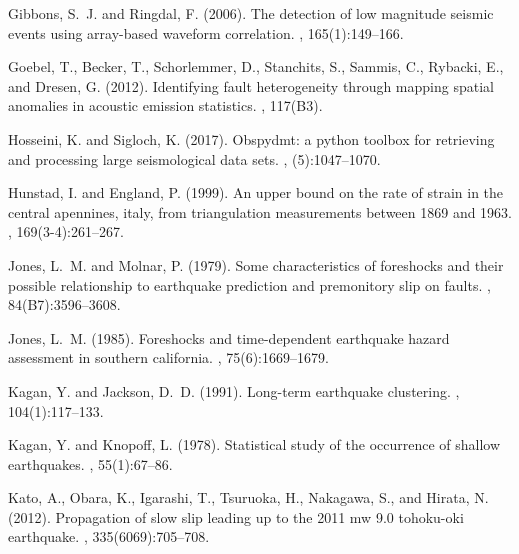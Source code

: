 \documentclass[a4paper,12pt,twoside]{article}
\begin{document}
\begin{thebibliography}{}
Gibbons, S.~J. and Ringdal, F. (2006).
\newblock The detection of low magnitude seismic events using array-based
  waveform correlation.
, 165(1):149--166.

Goebel, T., Becker, T., Schorlemmer, D., Stanchits, S., Sammis, C., Rybacki,
  E., and Dresen, G. (2012).
\newblock Identifying fault heterogeneity through mapping spatial anomalies in
  acoustic emission statistics.
, 117(B3).

Hosseini, K. and Sigloch, K. (2017).
\newblock Obspydmt: a python toolbox for retrieving and processing large
  seismological data sets.
, (5):1047--1070.

Hunstad, I. and England, P. (1999).
\newblock An upper bound on the rate of strain in the central apennines, italy,
  from triangulation measurements between 1869 and 1963.
, 169(3-4):261--267.

Jones, L.~M. and Molnar, P. (1979).
\newblock Some characteristics of foreshocks and their possible relationship to
  earthquake prediction and premonitory slip on faults.
,
  84(B7):3596--3608.

Jones, L.~M. (1985).
\newblock Foreshocks and time-dependent earthquake hazard assessment in
  southern california.
,
  75(6):1669--1679.

Kagan, Y. and Jackson, D.~D. (1991).
\newblock Long-term earthquake clustering.
, 104(1):117--133.

Kagan, Y. and Knopoff, L. (1978).
\newblock Statistical study of the occurrence of shallow earthquakes.
, 55(1):67--86.
  
Kato, A., Obara, K., Igarashi, T., Tsuruoka, H., Nakagawa, S., and Hirata, N.
  (2012).
\newblock Propagation of slow slip leading up to the 2011 mw 9.0 tohoku-oki
  earthquake.
, 335(6069):705--708.


\end{thebibliography}
\end{document}
